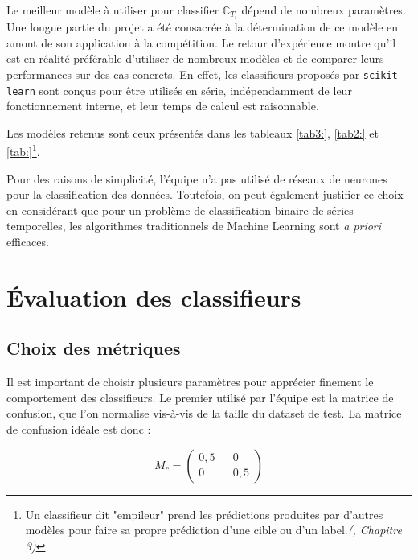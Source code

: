         Le meilleur modèle à utiliser pour classifier $\mathbb C_{T_i}$ dépend de nombreux
        paramètres. Une longue partie du projet a été consacrée à la détermination de ce modèle
        en amont de son application à la compétition.
        Le retour d'expérience montre qu'il est en réalité préférable d'utiliser de nombreux modèles
        et de comparer leurs performances sur des cas concrets. En effet, les classifieurs
        proposés par \texttt{scikit-learn} sont conçus pour être utilisés en série,
        indépendamment de leur fonctionnement interne, et leur temps de calcul est raisonnable.

        Les modèles retenus sont ceux présentés dans les tableaux \ref{tab3:}, \ref{tab2:} et \ref{tab:}\footnote{Un classifieur dit "empileur" prend les prédictions produites par d'autres modèles pour faire sa propre prédiction d'une cible ou d'un label.\textit{(\cite{MLFondamentaux}, Chapitre 3)}}.


        \begin{tcolorbox}[colback=linkborder_Color!5!white,colframe=linkborder_Color!75!black]
            Pour des raisons de simplicité, l'équipe n'a pas utilisé de réseaux de neurones pour
            la classification des données. Toutefois, on peut également justifier ce choix en
            considérant que pour un problème de classification binaire de séries temporelles,
            les algorithmes traditionnels de Machine Learning sont \textit{a priori} efficaces.
        \end{tcolorbox}
    \section{Évaluation des classifieurs}

        \subsection{Choix des métriques}

            Il est important de choisir plusieurs paramètres pour apprécier finement le
            comportement des classifieurs. Le premier utilisé par l'équipe est la matrice de
            confusion, que l'on normalise vis-à-vis de la taille du dataset de test. La matrice
            de confusion idéale est donc :

            \begin{equation}
                M_c = \begin{pmatrix}
                    0,5 && 0\\
                    0 && 0,5
                \end{pmatrix}
            \end{equation}

